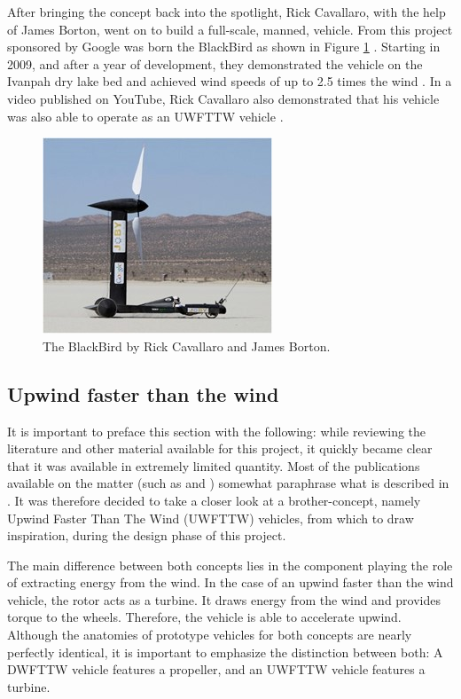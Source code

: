 After bringing the concept back into the spotlight, Rick Cavallaro, with the help of James Borton, went on to build a full-scale, manned, vehicle. From this project sponsored by Google was born the BlackBird as shown in Figure \ref{fig:blackbird} \cite{nast_2022}. Starting in 2009, and after a year of development, they demonstrated the vehicle on the Ivanpah dry lake bed and achieved wind speeds of up to 2.5 times the wind \cite{barry_2010}. In a video published on YouTube, Rick Cavallaro also demonstrated that his vehicle was also able to operate as an UWFTTW vehicle \cite{upwindyoutube}.

\begin{figure}[!htbp]
    \centering
    \includegraphics[width=0.6\linewidth]{images/part1/exisitingVeh3.jpg}
    \caption{The BlackBird by Rick Cavallaro and James Borton.}
    \label{fig:blackbird}
\end{figure}

\subsection{Upwind faster than the wind}

It is important to preface this section with the following: while reviewing the literature and other material available for this project, it quickly became clear that it was available in extremely limited quantity. Most of the publications available on the matter (such as \cite{mastersbs} and \cite{shetan}) somewhat paraphrase what is described in \cite{drela20dead}. It was therefore decided to take a closer look at a brother-concept, namely Upwind Faster Than The Wind (UWFTTW) vehicles, from which to draw inspiration, during the design phase of this project. 

The main difference between both concepts lies in the component playing the role of extracting energy from the wind. In the case of an upwind faster than the wind vehicle, the rotor acts as a turbine. It draws energy from the wind and provides torque to the wheels. Therefore, the vehicle is able to accelerate upwind. Although the anatomies of prototype vehicles for both concepts are nearly perfectly identical, it is important to emphasize the distinction between both: A DWFTTW vehicle features a propeller, and an UWFTTW vehicle features a turbine.

